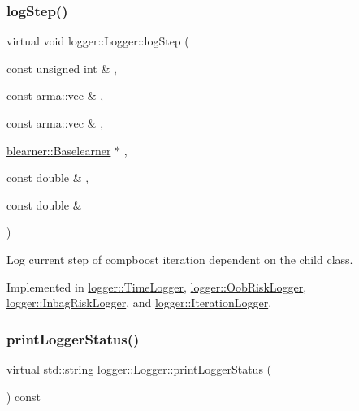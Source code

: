 \subsubsection{\texorpdfstring{log\+Step()}{logStep()}}
{\footnotesize\ttfamily virtual void logger\+::\+Logger\+::log\+Step (\begin{DoxyParamCaption}\item[{const unsigned int \&}]{,  }\item[{const arma\+::vec \&}]{,  }\item[{const arma\+::vec \&}]{,  }\item[{\hyperlink{classblearner_1_1_baselearner}{blearner\+::\+Baselearner} $\ast$}]{,  }\item[{const double \&}]{,  }\item[{const double \&}]{ }\end{DoxyParamCaption})\hspace{0.3cm}{\ttfamily [pure virtual]}}



Log current step of compboost iteration dependent on the child class. 



Implemented in \hyperlink{classlogger_1_1_time_logger_a9498311652805868b5a0ea7f5480f0be}{logger\+::\+Time\+Logger}, \hyperlink{classlogger_1_1_oob_risk_logger_a948a89f02ac782c25a15c49c4a108c02}{logger\+::\+Oob\+Risk\+Logger}, \hyperlink{classlogger_1_1_inbag_risk_logger_ad90612e1b684287a29bdbde1077d65d7}{logger\+::\+Inbag\+Risk\+Logger}, and \hyperlink{classlogger_1_1_iteration_logger_a36437ff3a6e6a617f6d2107eab9fba7a}{logger\+::\+Iteration\+Logger}.

\mbox{\label{classlogger_1_1_logger_abad818a7e8053ca84cb267e883b5e377}} 
\subsubsection{\texorpdfstring{print\+Logger\+Status()}{printLoggerStatus()}}
{\footnotesize\ttfamily virtual std\+::string logger\+::\+Logger\+::print\+Logger\+Status (\begin{DoxyParamCaption}{ }\end{DoxyParamCaption}) const\hspace{0.3cm}{\ttfamily [pure virtual]}}



